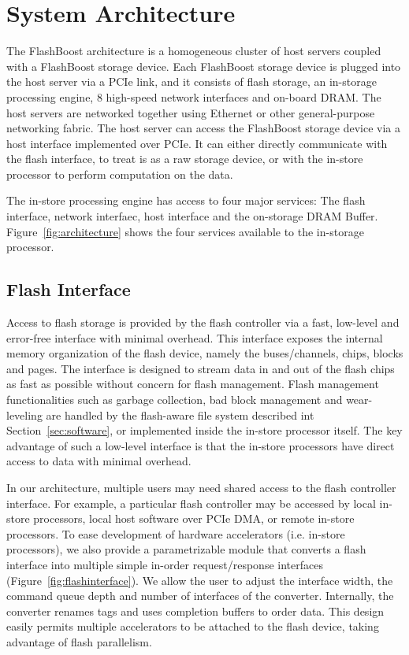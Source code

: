 \section{System Architecture}
\label{sec:architecture}

The FlashBoost architecture is a homogeneous cluster of host servers coupled
with a FlashBoost storage device. Each FlashBoost storage device is plugged into
the host server via a PCIe link, and it consists of flash storage, an in-storage
processing engine, 8 high-speed network interfaces and on-board DRAM. The host
servers are networked together using Ethernet or other general-purpose
networking fabric. The host server can access the FlashBoost storage device via
a host interface implemented over PCIe. It can either directly communicate with
the flash interface, to treat is as a raw storage device, or with the in-store
processor to perform computation on the data.

The in-store processing engine has access to four major services: The flash
interface, network interfaec, host interface and the on-storage DRAM Buffer.
Figure~\ref{fig:architecture} shows the four services available to the
in-storage processor.

\subsection{Flash Interface}

Access to flash storage is provided by the flash controller via a fast,
low-level and error-free interface with minimal overhead. This interface exposes
the internal memory organization of the flash device, namely the buses/channels,
chips, blocks and pages.  The interface is designed to stream data in and out of
the flash chips as fast as possible without concern for flash management. Flash
management functionalities such as garbage collection, bad block management and
wear-leveling are handled by the flash-aware file system described int
Section~\ref{sec:software}, or implemented inside the in-store processor itself.
The key advantage of such a low-level interface is that the in-store processors
have direct access to data with minimal overhead.

In our architecture, multiple users may need shared access to the
flash controller interface. For example, a particular flash controller may
be accessed by local in-store processors, local host software over PCIe
DMA, or remote in-store processors. 
To ease development of hardware accelerators (i.e. in-store processors),
we also provide a parametrizable module that converts a flash interface
into multiple simple in-order request/response interfaces
(Figure~\ref{fig:flashinterface}). We allow the user to adjust the interface width, the
command queue depth and number of interfaces of the converter.
Internally, the converter renames tags and uses completion buffers to
order data. This design easily permits multiple accelerators to be
attached to the flash device, taking advantage of flash parallelism. 


